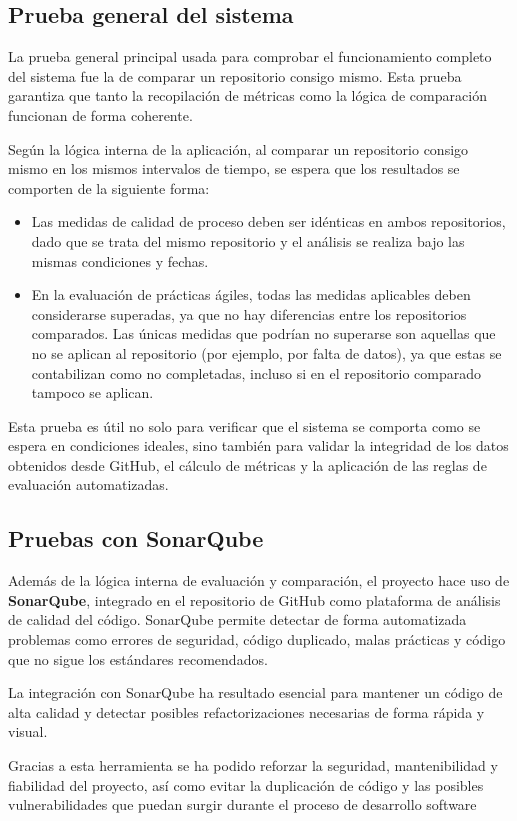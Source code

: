 \subsection{Prueba general del sistema}

La prueba general principal usada para comprobar el funcionamiento completo del sistema fue la de comparar un repositorio consigo mismo. Esta prueba garantiza que tanto la recopilación de métricas como la lógica de comparación funcionan de forma coherente.

Según la lógica interna de la aplicación, al comparar un repositorio consigo mismo en los mismos intervalos de tiempo, se espera que los resultados se comporten de la siguiente forma:

\begin{itemize}
    \item Las medidas de calidad de proceso deben ser idénticas en ambos repositorios, dado que se trata del mismo repositorio y el análisis se realiza bajo las mismas condiciones y fechas.
    
    \item En la evaluación de prácticas ágiles, todas las medidas aplicables deben considerarse superadas, ya que no hay diferencias entre los repositorios comparados. Las únicas medidas que podrían no superarse son aquellas que no se aplican al repositorio (por ejemplo, por falta de datos), ya que estas se contabilizan como no completadas, incluso si en el repositorio comparado tampoco se aplican.
\end{itemize}

Esta prueba es útil no solo para verificar que el sistema se comporta como se espera en condiciones ideales, sino también para validar la integridad de los datos obtenidos desde GitHub, el cálculo de métricas y la aplicación de las reglas de evaluación automatizadas.

\subsection{Pruebas con SonarQube}

Además de la lógica interna de evaluación y comparación, el proyecto hace uso de \textbf{SonarQube\cite{sonarqube}}, integrado en el repositorio de GitHub como plataforma de análisis de calidad del código. SonarQube permite detectar de forma automatizada problemas como errores de seguridad, código duplicado, malas prácticas y código que no sigue los estándares recomendados.

La integración con SonarQube ha resultado esencial para mantener un código de alta calidad y detectar posibles refactorizaciones necesarias de forma rápida y visual.

Gracias a esta herramienta se ha podido reforzar la seguridad, mantenibilidad y fiabilidad del proyecto, así como evitar la duplicación de código y las posibles vulnerabilidades que puedan surgir durante el proceso de desarrollo software